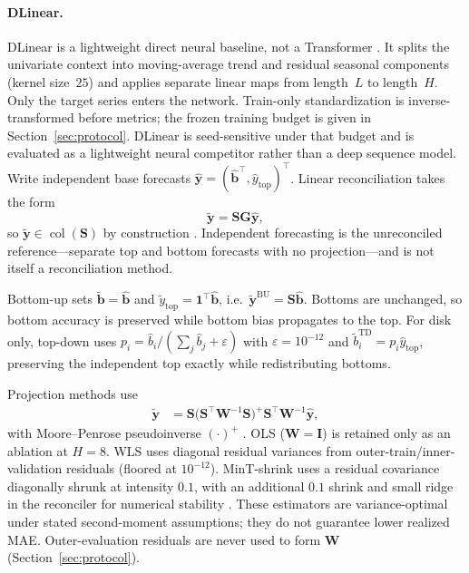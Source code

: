 \documentclass[a4paper,fleqn]{cas-dc}
\begin{document}
\paragraph{DLinear.}
DLinear is a lightweight direct neural baseline, not a Transformer
\cite{zeng2023dlinear}.
It splits the univariate context into moving-average trend and residual seasonal
components (kernel size~$25$) and applies separate linear maps from length~$L$
to length~$H$.
Only the target series enters the network.
Train-only standardization is inverse-transformed before metrics; the frozen
training budget is given in Section~\ref{sec:protocol}.
DLinear is seed-sensitive under that budget and is evaluated as a lightweight
neural competitor rather than a deep sequence model.
\label{sec:reconciliation}
Write independent base forecasts
$\hat{\mathbf{y}}=(\hat{\mathbf{b}}^\top,\hat{y}_{\mathrm{top}})^\top$.
Linear reconciliation takes the form
\begin{equation}
\tilde{\mathbf{y}}=\mathbf{S}\mathbf{G}\hat{\mathbf{y}},
\label{eq:recon}
\end{equation}
so $\tilde{\mathbf{y}}\in\operatorname{col}(\mathbf{S})$ by construction
\cite{hyndman2011optimal,athanasopoulos2024hierarchical}.
Independent forecasting is the unreconciled reference---separate top and bottom
forecasts with no projection---and is not itself a reconciliation method.

Bottom-up sets $\tilde{\mathbf{b}}=\hat{\mathbf{b}}$ and
$\tilde{y}_{\mathrm{top}}=\mathbf{1}^\top\hat{\mathbf{b}}$, i.e.\
$\tilde{\mathbf{y}}^{\mathrm{BU}}=\mathbf{S}\hat{\mathbf{b}}$.
Bottoms are unchanged, so bottom accuracy is preserved while bottom bias
propagates to the top.
For disk only, top-down uses
$p_i=\hat{b}_i/(\sum_j\hat{b}_j+\varepsilon)$ with $\varepsilon=10^{-12}$ and
$\tilde{b}_i^{\mathrm{TD}}=p_i\hat{y}_{\mathrm{top}}$, preserving the independent
top exactly while redistributing bottoms.

Projection methods use
\begin{equation}
\begin{aligned}
\tilde{\mathbf{y}}
&=
\mathbf{S}
\bigl(\mathbf{S}^{\top}\mathbf{W}^{-1}\mathbf{S}\bigr)^{+}
\mathbf{S}^{\top}\mathbf{W}^{-1}
\hat{\mathbf{y}},
\end{aligned}
\label{eq:projection}
\end{equation}
with Moore--Penrose pseudoinverse $(\cdot)^{+}$
\cite{wickramasuriya2019mint}.
{OLS} ($\mathbf{W}=\mathbf{I}$) is retained only as an ablation at $H=8$.
{WLS} uses diagonal residual variances from outer-train/inner-validation
residuals (floored at $10^{-12}$).
MinT-shrink uses a residual covariance diagonally shrunk at intensity $0.1$,
with an additional $0.1$ shrink and small ridge in the reconciler for numerical
stability \cite{schafer2005shrinkage,wickramasuriya2019mint}.
These estimators are variance-optimal under stated second-moment assumptions;
they do not guarantee lower realized {MAE}.
Outer-evaluation residuals are never used to form $\mathbf{W}$
(Section~\ref{sec:protocol}).
\end{document}
